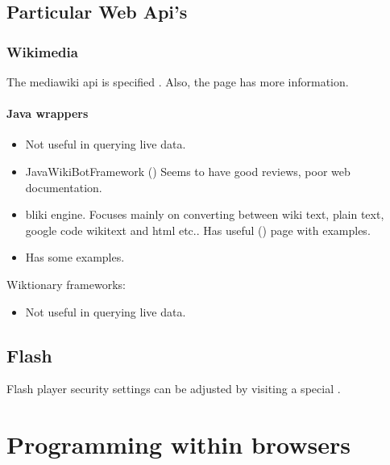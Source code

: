 \documentclass[oneside, article]{memoir}
\begin{document}
\chapter{Particular Web Api's}
\section{Wikimedia}
The mediawiki api is specified . Also, the  page has more information.

\subsection{Java wrappers}
\begin{itemize}
\item {}
  \subitem Not useful in querying live data.
\item JavaWikiBotFramework ()
  \subitem Seems to have good reviews, poor web documentation.
\item {} bliki engine.
  \subitem Focuses mainly on converting between wiki text, plain text, google code wikitext and html etc..
  \subitem Has useful  () page with examples.
\item {}
  \subitem Has some examples.
\end{itemize}

Wiktionary frameworks:
\begin{itemize}
\item {}
  \subitem Not useful in querying live data.
\end{itemize}


\chapter{Flash}
Flash player security settings can be adjusted by visiting a special .



\part{Programming within browsers}
\end{document}

